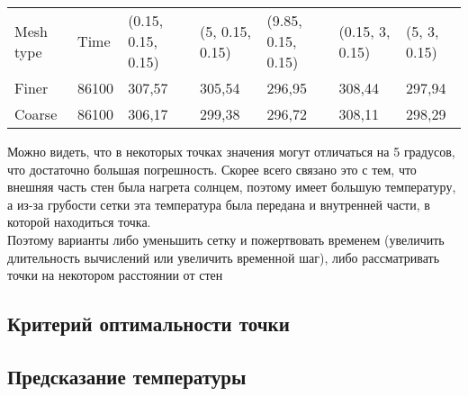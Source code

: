 \begin{table}[H]
\begin{tabular}{lllllll}
Mesh type  & Time  & (0.15, 0.15, 0.15) & (5, 0.15, 0.15) & (9.85, 0.15, 0.15) & (0.15, 3, 0.15) & (5, 3, 0.15) \\
Finer & 86100 & 307,57             & 305,54          & 296,95             & 308,44          & 297,94       \\
Coarse& 86100 & 306,17             & 299,38          & 296,72             & 308,11          & 298,29       \\ 
\end{tabular}
\end{table}
Можно видеть, что в некоторых точках значения могут отличаться на 5 градусов, что достаточно большая погрешность. Скорее всего связано это с тем, что внешняя часть стен была нагрета солнцем, поэтому имеет большую температуру, а из-за грубости сетки эта температура была передана и внутренней части, в которой находиться точка.\\
Поэтому варианты либо уменьшить сетку и пожертвовать временем (увеличить длительность вычислений или увеличить временной шаг), либо рассматривать точки на некотором расстоянии от стен

\newpage


\subsection{Критерий оптимальности точки}

\subsection{Предсказание температуры}

